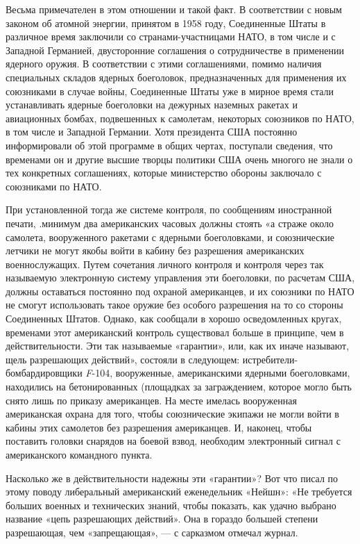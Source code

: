 \documentclass[12pt, a4paper, openany]{book}
\begin{document}
	Весьма примечателен в этом отношении и такой факт. В соответствии с новым законом об атомной энергии, принятом в 1958 году, Соединенные Штаты в различное время заключили со странами-участницами НАТО, в том числе и с Западной Германией, двусторонние соглашения о сотрудничестве в применении ядерного оружия. В соответствии с этими соглашениями, помимо наличия специальных складов ядерных боеголовок, предназначенных для применения их союзниками в случае войны, Соединенные Штаты уже в мирное время стали устанавливать ядерные боеголовки на дежурных наземных ракетах и авиационных бомбах, подвешенных к самолетам, некоторых союзников по НАТО, в том числе и Западной Германии. Хотя президента США постоянно информировали об этой программе в общих чертах, поступали сведения, что временами он и другие высшие творцы политики США очень многого не знали о тех конкретных соглашениях, которые министерство обороны заключало с союзниками по НАТО. 
	
	При установленной тогда же системе контроля, по сообщениям иностранной печати, .минимум два американских часовых должны стоять «а страже около самолета, вооруженного ракетами с ядерными боеголовками, и союзнические летчики не могут якобы войти в кабину без разрешения американских военнослужащих. Путем сочетания личного контроля и контроля через так называемую электронную систему управления эти боеголовки, по расчетам США, должны оставаться постоянно под охраной американцев, и их союзники по НАТО не смогут использовать такое оружие без особого разрешения на то со стороны Соединенных Штатов. Однако, как сообщали в хорошо осведомленных кругах, временами этот американский контроль существовал больше в принципе, чем в действительности. Эти так называемые «гарантии», или, как их иначе называют, щель разрешающих действий», состояли в следующем: истребители-бомбардировщики \textit{F}-104, вооруженные, американскими ядерными боеголовками, находились на бетонированных (площадках за заграждением, которое могло быть снято лишь по приказу американцев. На месте имелась вооруженная американская охрана для того, чтобы союзнические экипажи не могли войти в кабины этих самолетов без разрешения американцев. И, наконец, чтобы поставить головки снарядов на боевой взвод, необходим электронный сигнал с американского командного пункта.
	
	Насколько же в действительности надежны эти «гарантии»? Вот что писал по этому поводу либеральный американский еженедельник «Нейшн»: «Не требуется больших военных и технических знаний, чтобы показать, как удачно выбрано название «цепь разрешающих действий». Она в гораздо большей степени разрешающая, чем «запрещающая», — с сарказмом отмечал журнал.
	
\end{document}
